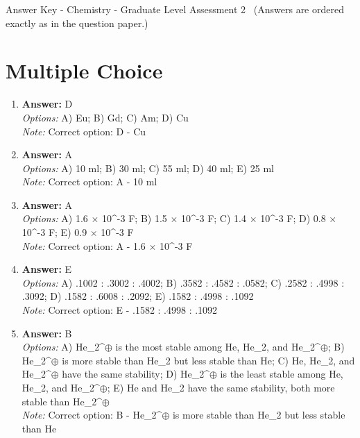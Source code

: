 \documentclass[12pt]{article}
\begin{document}
\begin{center}
Answer Key - Chemistry - Graduate Level Assessment 2 \
\small (Answers are ordered exactly as in the question paper.)
\end{center}

\section*{Multiple Choice}
\begin{enumerate}[label=\arabic*.]
\item \textbf{Answer:} D
\\ \textit{Options:} A) Eu; B) Gd; C) Am; D) Cu
\\ \textit{Note:} Correct option: D - Cu
\item \textbf{Answer:} A
\\ \textit{Options:} A) 10 ml; B) 30 ml; C) 55 ml; D) 40 ml; E) 25 ml
\\ \textit{Note:} Correct option: A - 10 ml
\item \textbf{Answer:} A
\\ \textit{Options:} A) 1.6 \ensuremath{\times} 10^-3 F; B) 1.5 \ensuremath{\times} 10^-3 F; C) 1.4 \ensuremath{\times} 10^-3 F; D) 0.8 \ensuremath{\times} 10^-3 F; E) 0.9 \ensuremath{\times} 10^-3 F
\\ \textit{Note:} Correct option: A - 1.6 \ensuremath{\times} 10^-3 F
\item \textbf{Answer:} E
\\ \textit{Options:} A) .1002 : .3002 : .4002; B) .3582 : .4582 : .0582; C) .2582 : .4998 : .3092; D) .1582 : .6008 : .2092; E) .1582 : .4998 : .1092
\\ \textit{Note:} Correct option: E - .1582 : .4998 : .1092
\item \textbf{Answer:} B
\\ \textit{Options:} A) He\_2^\ensuremath{\oplus} is the most stable among He, He\_2, and He\_2^\ensuremath{\oplus}; B) He\_2^\ensuremath{\oplus} is more stable than He\_2 but less stable than He; C) He, He\_2, and He\_2^\ensuremath{\oplus} have the same stability; D) He\_2^\ensuremath{\oplus} is the least stable among He, He\_2, and He\_2^\ensuremath{\oplus}; E) He and He\_2 have the same stability, both more stable than He\_2^\ensuremath{\oplus}
\\ \textit{Note:} Correct option: B - He\_2^\ensuremath{\oplus} is more stable than He\_2 but less stable than He
\end{enumerate}
\end{document}
